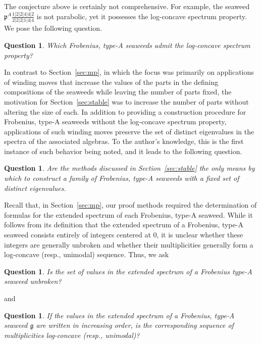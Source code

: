 \documentclass[letterpaper,10pt]{article}
\newtheorem{que}[theorem]{Question}
\begin{document}
\noindent The conjecture above is certainly not comprehensive. For example, the seaweed $\mathfrak{p}^A\frac{1|2|2|4|4|2}{2|2|2|1|4|4}$ is not parabolic, yet it possesses the log-concave spectrum property. We pose the following question.

\begin{que}\label{que:2}
Which Frobenius, type-A seaweeds admit the log-concave spectrum property?
\end{que}

 In contrast to Section~\ref{sec:mp}, in which the focus was primarily on applications of winding moves that increase the values of the parts in the defining compositions of the seaweeds while leaving the number of parts fixed, the motivation for Section~\ref{sec:stable} was to increase the number of parts without altering the size of each. In addition to providing a construction procedure for Frobenius, type-A seaweeds without the log-concave spectrum property, applications of such winding moves preserve the set of distinct eigenvalues in the spectra of the associated algebras. To the author's knowledge, this is the first instance of such behavior being noted, and it leads to the following question.

\begin{que}
Are the methods discussed in Section~\ref{sec:stable} the only means by which to construct a family of Frobenius, type-A seaweeds with a fixed set of distinct eigenvalues.
\end{que}

Recall that, in Section~\ref{sec:mp}, our proof methods required the determination of formulas for the extended spectrum of each Frobenius, type-A seaweed. While it follows from its definition that the extended spectrum of 
a Frobenius, type-A seaweed consists entirely of integers centered at 0, it is unclear whether these integers are generally unbroken and whether their multiplicities generally form a log-concave (resp., unimodal) sequence. Thus, we ask
\begin{que}\label{que:3}
\textit{Is the set of values in the extended spectrum of a Frobenius type-A seaweed unbroken?}
\end{que}
\noindent and
\begin{que}\label{que:4}
\textit{If the values in the extended spectrum of a Frobenius, type-A seaweed $\mathfrak{g}$ are written in increasing order, is the corresponding sequence of multiplicities log-concave \textup(resp., unimodal\textup)?}
\end{que}
\end{document}
